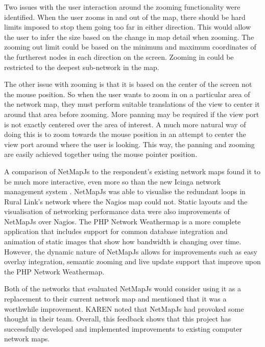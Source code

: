 \documentclass[11pt, a4paper]{article}
\begin{document}
Two issues with the user interaction around the zooming functionality were
identified. When the user zooms in and out of the map, there should be hard
limits imposed to stop them going too far in either direction. This would allow
the user to infer the size based on the change in map detail when zooming. The
zooming out limit could be based on the minimum and maximum coordinates of the
furtherest nodes in each direction on the screen. Zooming in could be restricted
to the deepest sub-network in the map.

The other issue with zooming is that it is based on the center of the screen not
the mouse position. So when the user wants to zoom in on a particular area of
the network map, they must perform suitable translations of the view to center
it around that area before zooming. More panning may be required if the view
port is not exactly centered over the area of interest. A much more natural way
of doing this is to zoom towards the mouse position in an attempt to center the
view port around where the user is looking. This way, the panning and zooming
are easily achieved together using the mouse pointer position.

A comparison of NetMapJs to the respondent's existing network maps found it to
be much more interactive, even more so than the new Icinga network management
system \cite{Icinga_website}. NetMapJs was able to visualise the redundant loops
in Rural Link's network where the Nagios map could not. Static layouts and the
visualisation of networking performance data were also improvements of NetMapJs
over Nagios. The PHP Network Weathermap is a more complete application that
includes support for common database integration and animation of static images
that show how bandwidth is changing over time. However, the dynamic nature of
NetMapJs allows for improvements such as easy overlay integration, semantic
zooming and live update support that improve upon the PHP Network Weathermap.

Both of the networks that evaluated NetMapJs would consider using it as a
replacement to their current network map and mentioned that it was a worthwhile
improvement. KAREN noted that NetMapJs had provoked some thought in their team.
Overall, this feedback shows that this project has successfully developed and
implemented improvements to existing computer network maps.
\end{document}
